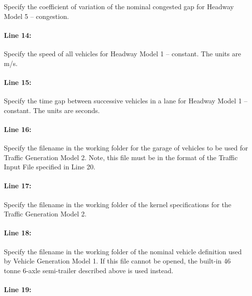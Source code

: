\documentclass[
]{article}
\begin{document}
Specify the coefficient of variation of the nominal congested gap for
Headway Model 5 -- congestion.

\paragraph*{Line 14:}\label{line-14}

Specify the speed of all vehicles for Headway Model 1 -- constant. The
units are m/s.

\paragraph*{Line 15:}\label{line-15}

Specify the time gap between successive vehicles in a lane for Headway
Model 1 -- constant. The units are seconds.

\paragraph*{Line 16:}\label{line-16}

Specify the filename in the working folder for the garage of vehicles to
be used for Traffic Generation Model 2. Note, this file must be in the
format of the Traffic Input File specified in Line 20.

\paragraph*{\texorpdfstring{Line 17: }{Line 17: }}\label{line-17}

Specify the filename in the working folder of the kernel specifications
for the Traffic Generation Model 2.

\paragraph*{Line 18:}\label{line-18}

Specify the filename in the working folder of the nominal vehicle
definition used by Vehicle Generation Model 1. If this file cannot be
opened, the built-in 46 tonne 6-axle semi-trailer described above is
used instead.

\paragraph*{Line 19:}\label{line-19}
\end{document}

